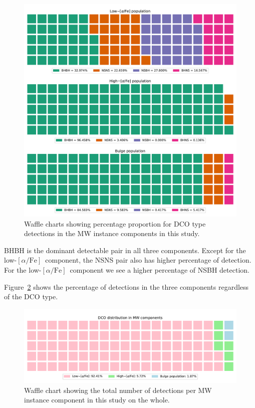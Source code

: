 \documentclass[twocolumn, twocolappendix]{aastex63}
\newcommand{\lowalpha}{low-$[\alpha/\text{Fe}]$}
\begin{document}
    \begin{figure}[!h]%
        \centering
        \includegraphics[width=\columnwidth]{analysis_data/004__images_for_latex/dco_type_MW_component_distribution}
        \caption{Waffle charts showing percentage proportion for DCO type detections in the MW instance components in this study.}
        \label{fig:dcotypemwcomponentdistributioncropped}
    \end{figure}%


    BHBH is the dominant detectable pair in all three components.
    Except for the \lowalpha\ component, the NSNS pair also has higher percentage of detection.
    For the \lowalpha\ component we see a higher percentage of NSBH detection.

    Figure~\ref{fig:dcotypemwdistribution} shows the percentage of detections in the three components regardless of the DCO type.

    \begin{figure}[!h]%
        \centering
        \includegraphics[width=\columnwidth]{analysis_data/004__images_for_latex/dco_type_MW_distribution}
        \caption{Waffle chart showing the total number of detections per MW instance component in this study on the whole.}
        \label{fig:dcotypemwdistribution}
    \end{figure}%
\end{document}
